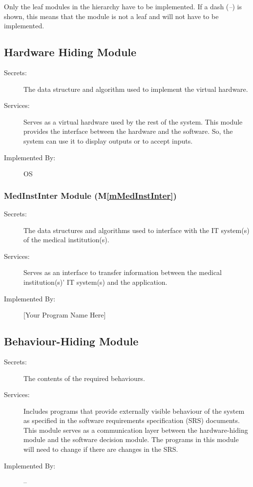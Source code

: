 \documentclass[12pt, titlepage]{article}
\newcommand{\mref}[1]{M\ref{#1}}
\begin{document}
Only the leaf modules in the hierarchy have to be implemented. If a dash
(\emph{--}) is shown, this means that the module is not a leaf and will not have
to be implemented.

\subsection{Hardware Hiding Module}

\begin{description}
\item[Secrets:] The data structure and algorithm used to implement the virtual
  hardware.
\item[Services:] Serves as a virtual hardware used by the rest of the
  system. This module provides the interface between the hardware and the
  software. So, the system can use it to display outputs or to accept inputs.
\item[Implemented By:] OS
\end{description}

\subsubsection{MedInstInter Module (\mref{mMedInstInter})}

\begin{description}
\item[Secrets:] The data structures and algorithms used to interface with
  the IT system(s) of the medical institution(s).
\item[Services:] Serves as an interface to transfer information between the
  medical institution(s)' IT system(s) and the application.
\item[Implemented By:] [Your Program Name Here]
\end{description}

\subsection{Behaviour-Hiding Module}

\begin{description}
\item[Secrets:] The contents of the required behaviours.
\item[Services:] Includes programs that provide externally visible behaviour
  of the system as specified in the software requirements specification (SRS)
  documents. This module serves as a communication layer between the
  hardware-hiding module and the software decision module. The programs in
  this module will need to change if there are changes in the SRS.
\item[Implemented By:] --
\end{description}
\end{document}

